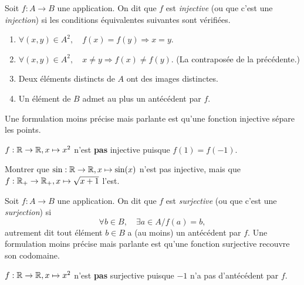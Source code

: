 \begin{definition}
Soit $f : A \to B$ une application. On dit que $f$ est \emph{injective} (ou que c'est une \emph{injection}) si les conditions équivalentes suivantes sont vérifiées.
\begin{enumerate}
\item $\forall (x,y) \in A^2,\quad f(x)=f(y) \Rightarrow  x=y$.
\item $\forall (x,y) \in A^2,\quad x\neq y \Rightarrow  f(x)\neq f(y)$. (La contraposée de la précédente.)
\item Deux éléments distincts de $A$ ont des images distinctes. 
\item Un élément de $B$ admet au plus un antécédent par $f$.
\end{enumerate}
Une formulation moins précise mais parlante est qu'une fonction injective \og sépare les points\fg{}.
\end{definition}

\begin{exemple}
$f : \mathbb{R}\to \mathbb{R}, x\mapsto x^2$ n'est \textbf{pas} injective puisque $f(1)=f(-1)$.
\end{exemple}


\begin{exercice}
Montrer que  $\sin : \mathbb{R}\to \mathbb{R}, x\mapsto \sin(x)$ n'est pas injective, mais que $f:\mathbb{R}_+\to \mathbb{R}_+, x\mapsto \sqrt{x+1}$ l'est.
\end{exercice}



\begin{definition}
Soit $f : A \to B$ une application. On dit que $f$ est \emph{surjective} (ou que c'est une \emph{surjection}) si
\[\forall b \in B,\quad \exists a\in A / f(a)=b,\]
autrement dit tout élément $b\in B$ a (au moins) un antécédent par $f$.
Une formulation moins précise mais parlante est  qu'une fonction surjective \og recouvre son codomaine\fg{}.
\end{definition}

\begin{exemple}
$f : \mathbb{R}\to \mathbb{R}, x\mapsto x^2$ n'est \textbf{pas} surjective puisque $-1$ n'a pas d'antécédent par $f$.
\end{exemple}

